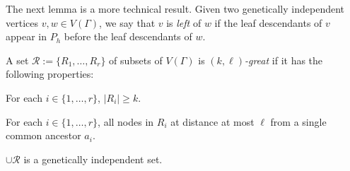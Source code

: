 \documentclass{patmorin}
\newcommand{\defin}[1]{\emph{\color{brightmaroon}#1}}
\begin{document}
The next lemma is a more technical result.  Given two genetically independent vertices $v,w\in V(\Gamma)$, we say that $v$ is \defin{left} of $w$ if the leaf descendants of $v$ appear in $P_h$ before the leaf descendants of $w$.




A set $\mathcal{R}:=\{R_1,\ldots,R_r\}$ of subsets of $V(\Gamma)$ is \defin{$(k,\ell)$-great} if it has the following properties:

\begin{compactenum}
  \item For each $i\in\{1,\ldots,r\}$, $|R_i|\ge k$.
  \item For each $i\in\{1,\ldots,r\}$, all nodes in $R_i$ at distance at most $\ell$ from a single common ancestor $a_i$.
  \item $\cup\mathcal{R}$ is a genetically independent set.
\end{compactenum}
\end{document}
